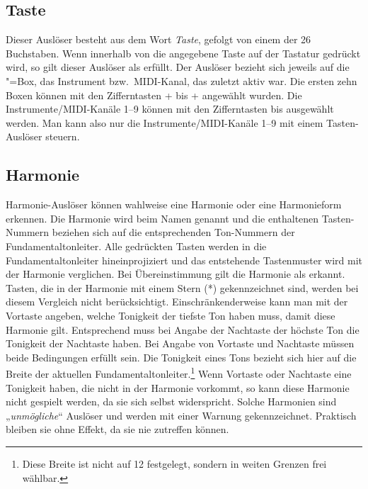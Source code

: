 

\subsection{Taste}\label{sec:tasten}

Dieser Auslöser
 besteht aus dem Wort \emph{Taste}, gefolgt von einem der
26 Buchstaben. Wenn innerhalb von \mutabor{} die angegebene Taste auf der
Tastatur gedrückt wird, so gilt dieser Auslöser als erfüllt.
Der Auslöser bezieht sich jeweils auf die \mutabor"=Box, das Instrument bzw.\ MIDI-Kanal,
das zuletzt aktiv war. Die ersten zehn Boxen können
mit den Zifferntasten \Ctrl+ bis \Ctrl+
angewählt wurden. Die Instrumente/MIDI-Kanäle 1–9 können mit den
Zifferntasten  bis  ausgewählt werden.
Man kann also nur die
Instrumente/MIDI-Kanäle 1--9 mit einem Tasten-Auslöser steuern.

      

\subsection{Harmonie}\label{sec:harmonien}
Harmonie-Auslöser
 können wahlweise eine Harmonie oder eine Harmonieform
erkennen. Die Harmonie wird beim Namen genannt und die enthaltenen
Tasten-Nummern beziehen sich auf die entsprechenden Ton-Nummern der
Fundamentaltonleiter.
Alle gedrückten Tasten werden in die
Fundamentaltonleiter hineinprojiziert und das entstehende Tastenmuster
wird mit der Harmonie verglichen. Bei Übereinstimmung gilt die
Harmonie als erkannt. Tasten, die in der Harmonie mit einem
Stern (*)\index{*} gekennzeichnet sind, werden bei diesem
Vergleich nicht berücksichtigt.
Einschränkenderweise kann man mit der Vortaste angeben,
welche Tonigkeit
der tiefste Ton haben muss, damit diese Harmonie gilt. Entsprechend muss
bei Angabe der Nachtaste der höchste Ton
die Tonigkeit der Nachtaste
haben. Bei Angabe von Vortaste und Nachtaste müssen beide Bedingungen
erfüllt sein. Die Tonigkeit eines Tons bezieht sich hier auf die Breite
der aktuellen Fundamentaltonleiter.\footnote{Diese Breite ist nicht
auf 12 festgelegt, sondern in weiten Grenzen frei wählbar.}
Wenn Vortaste oder Nachtaste eine Tonigkeit haben, die nicht in der
Harmonie vorkommt, so kann diese Harmonie nicht gespielt werden, da sie
sich selbst widerspricht. Solche Harmonien sind „\emph{unmögliche}“
Auslöser
 und werden mit einer Warnung gekennzeichnet. Praktisch
bleiben sie ohne Effekt, da sie nie zutreffen können.

